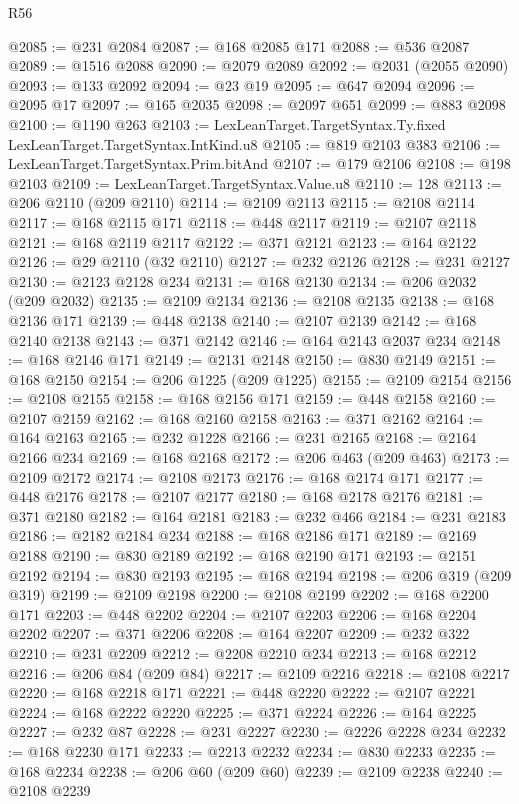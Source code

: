 \begin{lexlean}{R56}
\begin{coremodule}
@2085 := @231 @2084
@2087 := @168 @2085 @171
@2088 := @536 @2087
@2089 := @1516 @2088
@2090 := @2079 @2089
@2092 := @2031 (@2055 @2090)
@2093 := @133 @2092
@2094 := @23 @19
@2095 := @647 @2094
@2096 := @2095 @17
@2097 := @165 @2035
@2098 := @2097 @651
@2099 := @883 @2098
@2100 := @1190 @263
@2103 := LexLeanTarget.TargetSyntax.Ty.fixed LexLeanTarget.TargetSyntax.IntKind.u8
@2105 := @819 @2103 @383
@2106 := LexLeanTarget.TargetSyntax.Prim.bitAnd
@2107 := @179 @2106
@2108 := @198 @2103
@2109 := LexLeanTarget.TargetSyntax.Value.u8
@2110 := 128
@2113 := @206 @2110 (@209 @2110)
@2114 := @2109 @2113
@2115 := @2108 @2114
@2117 := @168 @2115 @171
@2118 := @448 @2117
@2119 := @2107 @2118
@2121 := @168 @2119 @2117
@2122 := @371 @2121
@2123 := @164 @2122
@2126 := @29 @2110 (@32 @2110)
@2127 := @232 @2126
@2128 := @231 @2127
@2130 := @2123 @2128 @234
@2131 := @168 @2130
@2134 := @206 @2032 (@209 @2032)
@2135 := @2109 @2134
@2136 := @2108 @2135
@2138 := @168 @2136 @171
@2139 := @448 @2138
@2140 := @2107 @2139
@2142 := @168 @2140 @2138
@2143 := @371 @2142
@2146 := @164 @2143 @2037 @234
@2148 := @168 @2146 @171
@2149 := @2131 @2148
@2150 := @830 @2149
@2151 := @168 @2150
@2154 := @206 @1225 (@209 @1225)
@2155 := @2109 @2154
@2156 := @2108 @2155
@2158 := @168 @2156 @171
@2159 := @448 @2158
@2160 := @2107 @2159
@2162 := @168 @2160 @2158
@2163 := @371 @2162
@2164 := @164 @2163
@2165 := @232 @1228
@2166 := @231 @2165
@2168 := @2164 @2166 @234
@2169 := @168 @2168
@2172 := @206 @463 (@209 @463)
@2173 := @2109 @2172
@2174 := @2108 @2173
@2176 := @168 @2174 @171
@2177 := @448 @2176
@2178 := @2107 @2177
@2180 := @168 @2178 @2176
@2181 := @371 @2180
@2182 := @164 @2181
@2183 := @232 @466
@2184 := @231 @2183
@2186 := @2182 @2184 @234
@2188 := @168 @2186 @171
@2189 := @2169 @2188
@2190 := @830 @2189
@2192 := @168 @2190 @171
@2193 := @2151 @2192
@2194 := @830 @2193
@2195 := @168 @2194
@2198 := @206 @319 (@209 @319)
@2199 := @2109 @2198
@2200 := @2108 @2199
@2202 := @168 @2200 @171
@2203 := @448 @2202
@2204 := @2107 @2203
@2206 := @168 @2204 @2202
@2207 := @371 @2206
@2208 := @164 @2207
@2209 := @232 @322
@2210 := @231 @2209
@2212 := @2208 @2210 @234
@2213 := @168 @2212
@2216 := @206 @84 (@209 @84)
@2217 := @2109 @2216
@2218 := @2108 @2217
@2220 := @168 @2218 @171
@2221 := @448 @2220
@2222 := @2107 @2221
@2224 := @168 @2222 @2220
@2225 := @371 @2224
@2226 := @164 @2225
@2227 := @232 @87
@2228 := @231 @2227
@2230 := @2226 @2228 @234
@2232 := @168 @2230 @171
@2233 := @2213 @2232
@2234 := @830 @2233
@2235 := @168 @2234
@2238 := @206 @60 (@209 @60)
@2239 := @2109 @2238
@2240 := @2108 @2239

\end{coremodule}
\end{lexlean}
